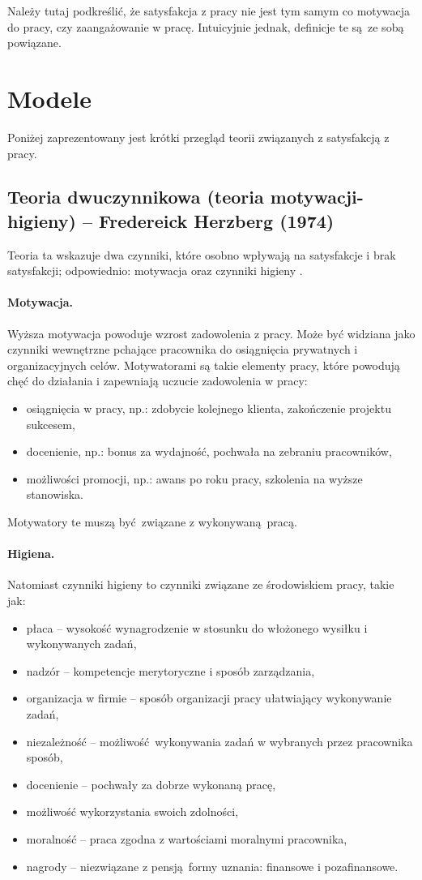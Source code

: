 Należy tutaj podkreślić, że satysfakcja z pracy nie jest tym samym co motywacja do pracy, czy zaangażowanie w pracę. Intuicyjnie jednak, definicje te są ze sobą powiązane.

\section{Modele}
Poniżej zaprezentowany jest krótki przegląd teorii związanych z satysfakcją z pracy.

\subsection{Teoria dwuczynnikowa (teoria motywacji-higieny) -- Fredereick Herzberg (1974)}
\label{sec:theory-sat-herz}
Teoria ta wskazuje dwa czynniki, które osobno wpływają na satysfakcje i brak satysfakcji; odpowiednio: motywacja oraz czynniki higieny \cite{herzberg1974motivation}. 

\paragraph{Motywacja.} Wyższa motywacja powoduje wzrost zadowolenia z pracy. Może być widziana jako czynniki wewnętrzne pchające pracownika do osiągnięcia prywatnych i organizacyjnych celów. Motywatorami są takie elementy pracy, które powodują chęć do działania i zapewniają uczucie zadowolenia w pracy:
\begin{itemize}
\item osiągnięcia w pracy, np.: zdobycie kolejnego klienta, zakończenie projektu sukcesem,
\item docenienie, np.: bonus za wydajność, pochwała na zebraniu pracowników,
\item możliwości promocji, np.: awans po roku pracy, szkolenia na wyższe stanowiska.
\end{itemize}
Motywatory te muszą być związane z wykonywaną pracą.

\paragraph{Higiena.} Natomiast czynniki higieny to czynniki związane ze środowiskiem pracy, takie jak:
\begin{itemize}
\item płaca -- wysokość wynagrodzenie w stosunku do włożonego wysiłku i wykonywanych zadań, 
\item nadzór -- kompetencje merytoryczne i sposób zarządzania,
\item organizacja w firmie -- sposób organizacji pracy ułatwiający wykonywanie zadań, 
\item niezależność -- możliwość wykonywania zadań w wybranych przez pracownika sposób,
\item docenienie -- pochwały za dobrze wykonaną pracę,
\item możliwość wykorzystania swoich zdolności,
\item moralność -- praca zgodna z wartościami moralnymi pracownika,
\item nagrody -- niezwiązane z pensją formy uznania: finansowe i pozafinansowe.
\end{itemize}

